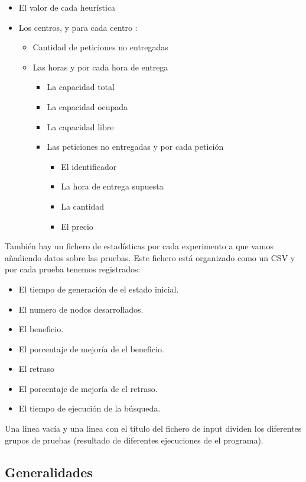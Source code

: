 \documentclass{article}
\begin{document}
\begin{itemize}
\item El valor de cada heurística
\item Los centros, y para cada centro :
	\begin{itemize}
		\item Cantidad de peticiones no entregadas
		\item Las horas y por cada hora de entrega
		\begin{itemize}		
			\item La capacidad total
			\item La capacidad ocupada
			\item La capacidad libre
			\item Las peticiones no entregadas y por cada petición		
			\begin{itemize}
			\item El identificador
			\item La hora de entrega supuesta
			\item La cantidad
			\item El precio
			\end{itemize}
		\end{itemize}
	\end{itemize}
\end{itemize}
También hay un fichero de estadísticas por cada experimento a que vamos
añadiendo datos sobre las pruebas. Este fichero está organizado como un CSV y
por cada prueba tenemos registrados:
\begin{itemize}
\item El tiempo de generación de el estado inicial.
\item El numero de nodos desarrollados. 
\item El beneficio.
\item El porcentaje de mejoría de el beneficio.
\item El retraso
\item El porcentaje de mejoría de el retraso.
\item El tiempo de ejecución de la búsqueda.
\end{itemize}
Una linea vacía y una linea con el título del fichero de input dividen los diferentes grupos de pruebas (resultado de diferentes ejecuciones de el programa).

\subsection{Generalidades}
\end{document}
